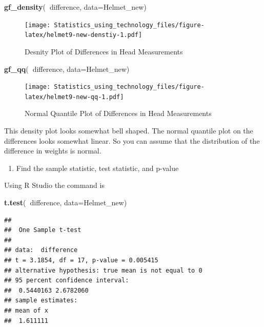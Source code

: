 \documentclass[]{book}
\newenvironment{Shaded}{\begin{snugshade}}{\end{snugshade}}
\newcommand{\DataTypeTok}[1]{\textcolor[rgb]{0.13,0.29,0.53}{#1}}
\newcommand{\KeywordTok}[1]{\textcolor[rgb]{0.13,0.29,0.53}{\textbf{#1}}}
\newcommand{\NormalTok}[1]{#1}
\newcommand{\OperatorTok}[1]{\textcolor[rgb]{0.81,0.36,0.00}{\textbf{#1}}}
\providecommand{\tightlist}{%
  \setlength{\itemsep}{0pt}\setlength{\parskip}{0pt}}
\begin{document}
\begin{Shaded}
\begin{Highlighting}[]
\KeywordTok{gf_density}\NormalTok{(}\OperatorTok{~}\NormalTok{difference, }\DataTypeTok{data=}\NormalTok{Helmet_new)}
\end{Highlighting}
\end{Shaded}

\begin{figure}
\centering
\texttt{[image: Statistics\_using\_technology\_files/figure-latex/helmet9-new-denstiy-1.pdf]}
\caption{\label{fig:helmet9-new-denstiy}Desnity Plot of Differences in Head Measurements}
\end{figure}



\begin{Shaded}
\begin{Highlighting}[]
\KeywordTok{gf_qq}\NormalTok{(}\OperatorTok{~}\NormalTok{difference, }\DataTypeTok{data=}\NormalTok{Helmet_new)}
\end{Highlighting}
\end{Shaded}

\begin{figure}
\centering
\texttt{[image: Statistics\_using\_technology\_files/figure-latex/helmet9-new-qq-1.pdf]}
\caption{\label{fig:helmet9-new-qq}Normal Quantile Plot of Differences in Head Measurements}
\end{figure}

This density plot looks somewhat bell shaped. The normal quantile plot on the differences looks somewhat linear. So you can assume that the distribution of the difference in weights is normal.

\begin{enumerate}
\def\labelenumi{\arabic{enumi}.}
\setcounter{enumi}{3}
\tightlist
\item
  Find the sample statistic, test statistic, and p-value
\end{enumerate}

Using R Studio the command is

\begin{Shaded}
\begin{Highlighting}[]
\KeywordTok{t.test}\NormalTok{(}\OperatorTok{~}\NormalTok{difference, }\DataTypeTok{data=}\NormalTok{Helmet_new)}
\end{Highlighting}
\end{Shaded}

\begin{verbatim}
## 
##  One Sample t-test
## 
## data:  difference
## t = 3.1854, df = 17, p-value = 0.005415
## alternative hypothesis: true mean is not equal to 0
## 95 percent confidence interval:
##  0.5440163 2.6782060
## sample estimates:
## mean of x 
##  1.611111
\end{verbatim}
\end{document}
